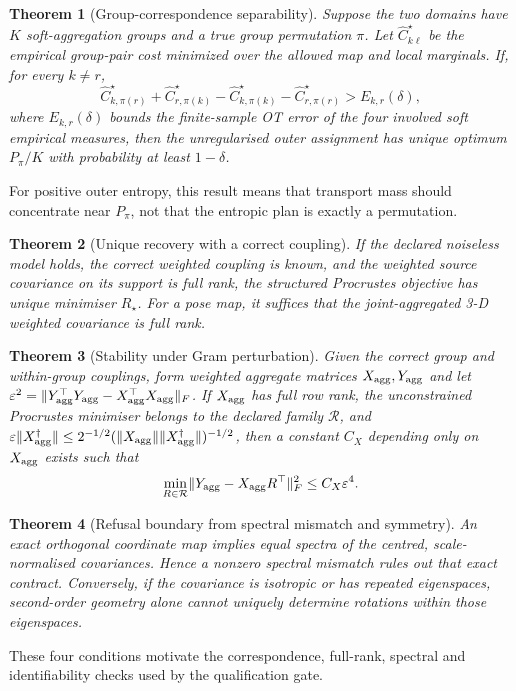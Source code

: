 \documentclass[10pt,a4paper]{article}
\newtheorem{theorem}{Theorem}
\begin{document}
\begin{theorem}[Group-correspondence separability]\label{thm:en-correspondence}
Suppose the two domains have $K$ soft-aggregation groups and a true group permutation $\pi$. Let $\widehat C_{k\ell}^{\star}$ be the empirical group-pair cost minimized over the allowed map and local marginals. If, for every $k\ne r$,
\begin{equation}
\widehat C_{k,\pi(r)}^{\star}+\widehat C_{r,\pi(k)}^{\star}-\widehat C_{k,\pi(k)}^{\star}-\widehat C_{r,\pi(r)}^{\star}>E_{k,r}(\delta),
\label{eq:en-exchange-margin}
\end{equation}
where $E_{k,r}(\delta)$ bounds the finite-sample OT error of the four involved soft empirical measures, then the unregularised outer assignment has unique optimum $P_\pi/K$ with probability at least $1-\delta$.
\end{theorem}
For positive outer entropy, this result means that transport mass should concentrate near $P_\pi$, not that the entropic plan is exactly a permutation.

\begin{theorem}[Unique recovery with a correct coupling]\label{thm:en-recovery}
If the declared noiseless model holds, the correct weighted coupling is known, and the weighted source covariance on its support is full rank, the structured Procrustes objective has unique minimiser $R_\star$. For a pose map, it suffices that the joint-aggregated 3-D weighted covariance is full rank.
\end{theorem}

\begin{theorem}[Stability under Gram perturbation]\label{thm:en-stability}
Given the correct group and within-group couplings, form weighted aggregate matrices $X_{\rm agg},Y_{\rm agg}$ and let $\varepsilon^2=\lVert Y_{\rm agg}^\top Y_{\rm agg}-X_{\rm agg}^\top X_{\rm agg}\rVert_F$. If $X_{\rm agg}$ has full row rank, the unconstrained Procrustes minimiser belongs to the declared family $\mathcal R$, and $\varepsilon\lVert X_{\rm agg}^\dagger\rVert\le 2^{-1/2}(\lVert X_{\rm agg}\rVert\lVert X_{\rm agg}^\dagger\rVert)^{-1/2}$, then a constant $C_X$ depending only on $X_{\rm agg}$ exists such that
\begin{equation}
\min_{R\in\mathcal R}\lVert Y_{\rm agg}-X_{\rm agg}R^\top\rVert_F^2\le C_X\varepsilon^4.
\label{eq:en-gram-bound}
\end{equation}
\end{theorem}

\begin{theorem}[Refusal boundary from spectral mismatch and symmetry]\label{thm:en-refusal}
An exact orthogonal coordinate map implies equal spectra of the centred, scale-normalised covariances. Hence a nonzero spectral mismatch rules out that exact contract. Conversely, if the covariance is isotropic or has repeated eigenspaces, second-order geometry alone cannot uniquely determine rotations within those eigenspaces.
\end{theorem}
These four conditions motivate the correspondence, full-rank, spectral and identifiability checks used by the qualification gate.
\end{document}
